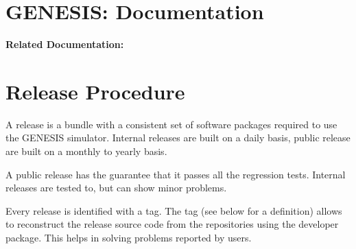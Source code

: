 \documentclass[12pt]{article}
\begin{document}
\section*{GENESIS: Documentation}

{\bf Related Documentation:}

\section*{Release Procedure}

A release is a bundle with a consistent set of software packages
required to use the GENESIS simulator.  Internal releases are built on
a daily basis, public release are built on a monthly to yearly basis.

A public release has the guarantee that it passes all the regression
tests.  Internal releases are tested to, but can show minor problems.

Every release is identified with a tag.  The tag (see below for a
definition) allows to reconstruct the release source code from the
repositories using the developer package.  This helps in solving
problems reported by users.
\end{document}
